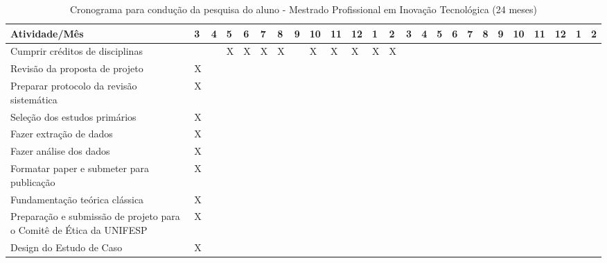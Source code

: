 \documentclass[quali]{mpit}
\begin{document}
\begin{table}[h]
\centering
\caption{Cronograma para condução da pesquisa do aluno - Mestrado Profissional em Inovação Tecnológica (24 meses)}
\label{crono}
\begin{tabular}{l | l | l | l | l | l | l | l | l | l | l | l | l | l | l | l | l | l | l | l | l | l | l | l | l }
\hline
\textbf{Atividade/Mês} & \textbf{3} & \textbf{4} & \textbf{5} & \textbf{6}  & \textbf{7} & \textbf{8} & \textbf{9} & \textbf{10} & \textbf{11} & \textbf{12} & \textbf{1} & \textbf{2} & \textbf{3} & \textbf{4} & \textbf{5} & \textbf{6} & \textbf{7} & \textbf{8} & \textbf{9} & \textbf{10} & \textbf{11} & \textbf{12} & \textbf{1} & \textbf{2}\\ \hline \hline
Cumprir créditos de disciplinas  &   &   &X   &X   &X   &X   &   &X   &X   &X   &X   &X   &   &   &   &   &  &   &   &  &   \\ \hline
Revisão da proposta de projeto & X  &   &   &   &   &   &   &   &   &   &   &   &   &   &   &   &  &   &   &  &   \\ \hline
Preparar protocolo da revisão sistemática& X  &   &   &   &   &   &   &   &   &   &   &   &   &   &   &   &  &   &   &  &   \\ \hline

Seleção dos estudos primários & X  &   &   &   &   &   &   &   &   &   &   &   &   &   &   &   &  &   &   &  &   \\ \hline

Fazer extração de dados & X  &   &   &   &   &   &   &   &   &   &   &   &   &   &   &   &  &   &   &  &   \\ \hline

Fazer análise dos dados& X  &   &   &   &   &   &   &   &   &   &   &   &   &   &   &   &  &   &   &  &   \\ \hline

Formatar paper e submeter para publicação & X  &   &   &   &   &   &   &   &   &   &   &   &   &   &   &   &  &   &   &  &   \\ \hline

Fundamentação teórica clássica& X  &   &   &   &   &   &   &   &   &   &   &   &   &   &   &   &  &   &   &  &   \\ \hline

Preparação e submissão de projeto para o Comitê de Ética da UNIFESP & X  &   &   &   &   &   &   &   &   &   &   &   &   &   &   &   &  &   &   &  &   \\ \hline

Design do Estudo de Caso & X  &   &   &   &   &   &   &   &   &   &   &   &   &   &   &   &  &   &   &  &   \\ \hline


\end{tabular}
\end{table}
\end{document}
